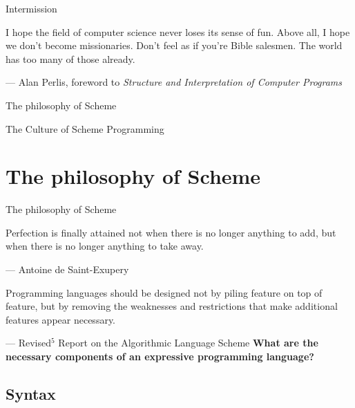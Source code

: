\documentclass{beamer}
\begin{document}
\begin{frame}{Intermission}

  \begin{displayquote}
    I hope the field of computer science never loses its sense of fun. Above all,
    I hope we don't become missionaries. Don't feel as if you're Bible salesmen.
    The world has too many of those already. 
  \end{displayquote}
  --- Alan Perlis, foreword to \textit{Structure and Interpretation of Computer Programs}
\end{frame}

\begin{frame}{The philosophy of Scheme}
  \begin{center}
    \begin{Huge}
      The Culture of Scheme Programming
    \end{Huge}
  \end{center}
  
\end{frame}

\section{The philosophy of Scheme}

\begin{frame}{The philosophy of Scheme}
  \begin{displayquote}
    Perfection is finally attained not when there is no longer
    anything to add, but when there is no longer anything to take away.
  \end{displayquote}
  ---  Antoine de Saint-Exupery
  \pause
  \begin{displayquote}
    Programming languages should be designed not by piling feature
    on top of feature, but by removing the weaknesses and restrictions
    that make additional features appear necessary.
  \end{displayquote}
  --- Revised$^5$ Report on the Algorithmic Language Scheme
  \pause
  \textbf{What are the necessary components of an expressive programming language?}
  
\end{frame}

\subsection{Syntax}
\end{document}
